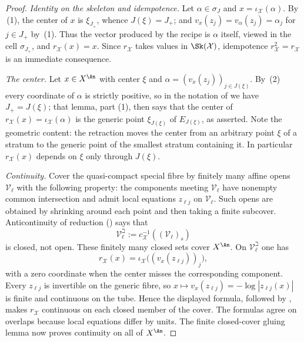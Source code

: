 \begin{proof}
\emph{Identity on the skeleton and idempotence.} Let
$\alpha\in\sigma_J$ and $x=\iota_{\mathcal X}(\alpha)$. By
\,(1), the center of $x$ is
$\xi_{J_+}$, whence $J(\xi)=J_+$; and
$v_x(z_j)=v_\alpha(z_j)=\alpha_j$ for $j\in J_+$ by
\,(1). Thus the vector produced by the
recipe is $\alpha$ itself, viewed in the cell $\sigma_{J_+}$, and
$r_{\mathcal X}(x)=x$. Since $r_{\mathcal X}$ takes values in
$\Sk(\mathcal X)$, idempotence $r_{\mathcal X}^2=r_{\mathcal X}$ is an
immediate consequence.

\emph{The center.} Let $x\in X^{\An}$ with center $\xi$ and
$\alpha=(v_x(z_j))_{j\in J(\xi)}$. By
\,(2) every coordinate of $\alpha$ is
strictly positive, so in the notation of
 we have $J_+=J(\xi)$; that lemma,
part (1), then says that the center of
$r_{\mathcal X}(x)=\iota_{\mathcal X}(\alpha)$ is the generic point
$\xi_{J(\xi)}$ of $E_{J(\xi)}$, as asserted. Note the geometric
content: the retraction moves the center from an arbitrary point $\xi$ of
a stratum to the generic point of the smallest stratum containing it. In
particular $r_{\mathcal X}(x)$ depends on $\xi$ only through
$J(\xi)$.

\emph{Continuity.} Cover the quasi-compact special fibre by finitely many
affine opens $\mathcal V_\ell$ with the following property: the components
meeting $\mathcal V_\ell$ have nonempty common intersection and admit
local equations $z_{\ell j}$ on $\mathcal V_\ell$.  Such opens are
obtained by shrinking around each point and then taking a finite subcover.
Anticontinuity of reduction
() says that
\[
 \mathcal V_\ell^{\beth}
 :=c_{\mathcal X}^{-1}((\mathcal V_\ell)_s)
\]
is closed, not open.  These finitely many closed sets cover $X^{\An}$.
On $\mathcal V_\ell^{\beth}$ one has
\[
 r_{\mathcal X}(x)=\iota_{\mathcal X}
   \bigl((v_x(z_{\ell j}))_j\bigr),
\]
with a zero coordinate when the center misses the corresponding component.
Every $z_{\ell j}$ is invertible on the generic fibre, so
$x\mapsto v_x(z_{\ell j})=-\log|z_{\ell j}(x)|$ is finite and continuous
on the tube.  Hence the displayed formula, followed by
, makes $r_{\mathcal X}$ continuous on each
closed member of the cover.  The formulas agree on overlaps because local
equations differ by units.  The finite closed-cover gluing lemma now proves
continuity on all of $X^{\An}$.
\end{proof}


